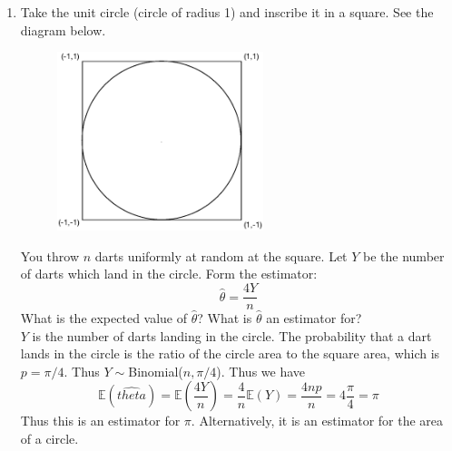 \documentclass[12pt]{article}
\def\E{{\mathbb E}}
\begin{document}
\begin{enumerate}
\item Take the unit circle (circle of radius 1) and inscribe it in a square. See the diagram below.

\begin{figure}[H]
\centering
\includegraphics[width=6cm]{squarecircle.eps}
\end{figure}

You throw $n$ darts uniformly at random at the square. Let $Y$ be the number of darts which land in the circle. Form the estimator:
\[
\hat{\theta} = \frac{4Y}{n}
\]
What is the expected value of $\hat{\theta}$? What is $\hat{\theta}$ an estimator for?\\

$Y$ is the number of darts landing in the circle. The probability that a dart lands in the circle is the ratio of the circle area to the square area, which is $p = \pi / 4$. Thus $Y \sim $Binomial($n, \pi/4$). Thus we have
\[
\E(\hat{theta}) = \E\left( \frac{4Y}{n}\right) = \frac{4}{n} \E(Y) = \frac{4np}{n} = 4 \frac{\pi}{4} = \pi
\]
Thus this is an estimator for $\pi$. Alternatively, it is an estimator for the area of a circle.

\end{enumerate}
\end{document}
